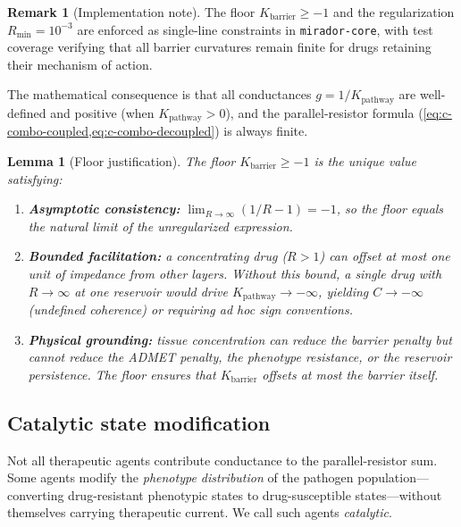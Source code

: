 \documentclass[11pt]{article}
\theoremstyle{plain}
\newtheorem{lemma}[theorem]{Lemma}
\theoremstyle{definition}
\newtheorem{remark}[theorem]{Remark}
\newcommand{\Kpath}{K_{\mathrm{pathway}}}
\newcommand{\Kbarr}{K_{\mathrm{barrier}}}
\begin{document}
\begin{remark}[Implementation note]
\label{rem:implementation-floor}
The floor $\Kbarr \geq -1$ and the regularization $R_{\min} =
10^{-3}$ are enforced as single-line constraints in
\texttt{mirador-core}, with test coverage verifying that all
barrier curvatures remain finite for drugs retaining their
mechanism of action.
\end{remark}

The mathematical consequence is that all conductances
$g = 1/\Kpath$ are well-defined and positive (when $\Kpath > 0$),
and the parallel-resistor formula (\cref{eq:c-combo-coupled,eq:c-combo-decoupled}) is always
finite.

\begin{lemma}[Floor justification]
\label{lem:floor}
The floor $\Kbarr \geq -1$ is the unique value satisfying:
\begin{enumerate}[label=(\roman*)]
  \item \textbf{Asymptotic consistency:}
    $\lim_{R \to \infty}(1/R - 1) = -1$, so the floor equals the
    natural limit of the unregularized expression.
  \item \textbf{Bounded facilitation:} a concentrating drug
    ($R > 1$) can offset at most one unit of impedance from
    other layers. Without this bound, a single drug with $R \to
    \infty$ at one reservoir would drive $\Kpath \to -\infty$,
    yielding $C \to -\infty$ (undefined coherence) or requiring
    ad hoc sign conventions.
  \item \textbf{Physical grounding:} tissue concentration can
    reduce the barrier penalty but cannot reduce the ADMET penalty,
    the phenotype resistance, or the reservoir persistence. The
    floor ensures that $\Kbarr$ offsets at most the barrier itself.
\end{enumerate}
\end{lemma}

\subsection{Catalytic state modification}
\label{sec:catalytic}

Not all therapeutic agents contribute conductance to the
parallel-resistor sum. Some agents modify the \emph{phenotype
distribution} of the pathogen population---converting drug-resistant
phenotypic states to drug-susceptible states---without themselves
carrying therapeutic current. We call such agents \emph{catalytic}.
\end{document}
